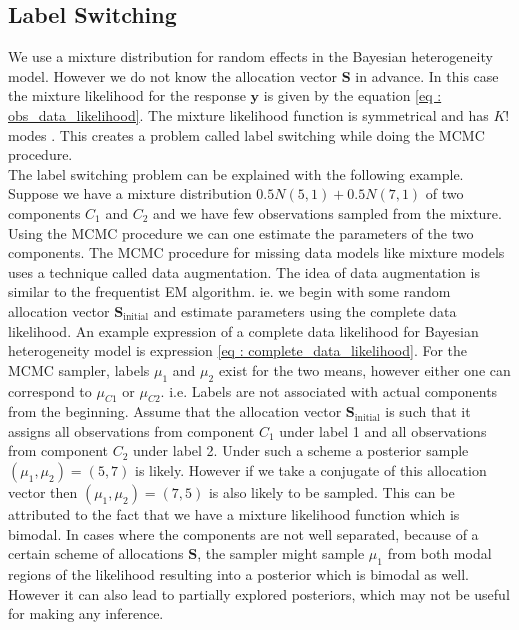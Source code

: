 \subsection{Label Switching}
\label{subsec : label_switching_blmm}
We use a mixture distribution for random effects in the Bayesian heterogeneity model. However we do not know the allocation vector $\boldsymbol{S}$ in advance. In this case the mixture likelihood for the response $\boldsymbol{y}$ is given by the equation \ref{eq : obs_data_likelihood}. The mixture likelihood function is symmetrical and has $K!$ modes \citep[pg. 44]{fruhwirth-schnatter_finite_2013}. This creates a problem called label switching while doing the MCMC procedure.\\

The label switching problem can be explained with the following example. Suppose we have a mixture distribution $0.5N(5,1) + 0.5N(7,1)$ of two components $C_1$ and $C_2$ and we have few observations sampled from the mixture. Using the MCMC procedure we can one estimate the parameters of the two components. The MCMC procedure for missing data models like mixture models uses a technique called data augmentation. The idea of data augmentation is similar to the frequentist EM algorithm. ie. we begin with some random allocation vector $\boldsymbol{S}_\text{initial}$ and estimate parameters using the complete data likelihood. An example expression of a complete data likelihood for Bayesian heterogeneity model is expression \ref{eq : complete_data_likelihood}. For the MCMC sampler, labels $\mu_1$ and $\mu_2$ exist for the two means, however either one can correspond to $\mu_{C1}$ or $\mu_{C2}$. i.e. Labels are not associated with actual components from the beginning. Assume that the allocation vector $\boldsymbol{S}_\text{initial}$ is such that it assigns all observations from component $C_1$ under label 1 and all observations from component $C_2$ under label 2. Under such a scheme a posterior sample $(\mu_1,\mu_2) = (5,7)$ is likely. However if we take a conjugate of this allocation vector then $(\mu_1,\mu_2) = (7,5)$ is also likely to be sampled. This can be attributed to the fact that we have a mixture likelihood function which is bimodal. In cases where the components are not well separated, because of a certain scheme of allocations $\boldsymbol{S}$, the sampler might sample $\mu_1$ from both modal regions of the likelihood resulting into a posterior which is bimodal as well. However it can also lead to partially explored posteriors, which may not be useful for making any inference.

